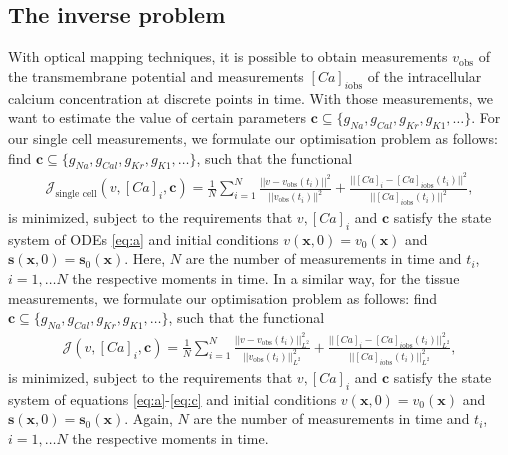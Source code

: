\documentclass[12pt,a4paper]{article}
\begin{document}
\subsection{The inverse problem} \label{The inverse problem}
With optical mapping techniques, it is possible to obtain measurements $v_{\text{obs}}$ of the transmembrane potential and measurements $[Ca]_{i\text{obs}}$ of the intracellular calcium concentration at discrete points in time. With those measurements, we want to estimate the value of certain parameters $\boldsymbol{c}\subseteq \{g_{Na}, g_{Cal}, g_{Kr}, g_{K1}, \ldots \}$. For our single cell measurements, we formulate our optimisation problem as follows: find $\boldsymbol{c} \subseteq\{ g_{Na}, g_{Cal}, g_{Kr}, g_{K1}, \ldots \}$, such that the functional
\begin{eqnarray} \nonumber
\mathcal{J}_{\text{single cell}}(v, [Ca]_i, \boldsymbol{c}) = \frac{1}{N} \sum_{i=1}^{N} \frac{||v-v_{\text{obs}}(t_i)||^2}{||v_{\text{obs}}(t_i)||^2} + \frac{||[Ca]_i-[Ca]_{i\text{obs}}(t_i) ||^2}{||[Ca]_{i\text{obs}}(t_i) ||^2},\label{J_sc}
\end{eqnarray}
is minimized, subject to the requirements that $v, [Ca]_i$ and $\boldsymbol{c}$ satisfy the state system of ODEs \eqref{eq:a} and initial conditions $v(\textbf{x},0)=v_0(\textbf{x})$ and $\mathbf{s}(\mathbf{x},0)=\mathbf{s}_0(\mathbf{x})$. Here, $N$ are the number of measurements in time and $t_i$, $i=1, \dots N$ the respective moments in time. 
In a similar way, for the tissue measurements, we formulate our optimisation problem as follows: find $\boldsymbol{c} \subseteq\{ g_{Na}, g_{Cal}, g_{Kr}, g_{K1}, \ldots \}$, such that the functional
\begin{eqnarray} \nonumber
\mathcal{J}(v, [Ca]_i, \boldsymbol{c}) = \frac{1}{N} \sum_{i=1}^{N} \frac{||v-v_{\text{obs}}(t_i)||^2_{L^2}}{||v_{\text{obs}}(t_i)||^2_{L^2}} + \frac{||[Ca]_i-[Ca]_{i\text{obs}}(t_i) ||^2_{L^2}}{||[Ca]_{i\text{obs}}(t_i) ||^2_{L^2}},\label{J}
\end{eqnarray}
is minimized, subject to the requirements that $v, [Ca]_i$ and $\boldsymbol{c}$ satisfy the state system of equations \eqref{eq:a}-\eqref{eq:c} and initial conditions $v(\textbf{x},0)=v_0(\textbf{x})$ and $\mathbf{s}(\mathbf{x},0)=\mathbf{s}_0(\mathbf{x})$. Again, $N$ are the number of measurements in time and $t_i$, $i=1, \dots N$ the respective moments in time. 
%
\end{document}
